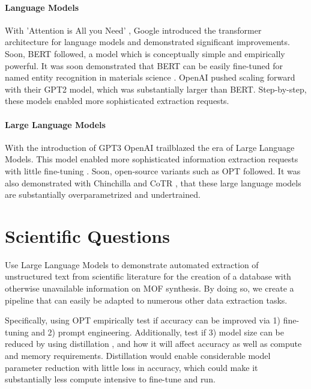 \documentclass[a4paper,12pt]{article}
\newcommand{\margtodo}                                 %
{\marginpar{\textbf{\textcolor{red}{ToDo}}}{}}
\newcommand{\todo}[1]
{{\textbf{\textcolor{red}{[\margtodo{}#1]}}}{}}   %
\begin{document}
\paragraph{Language Models}
With 'Attention is All you Need' \cite{vaswani_attention_2017}, Google
introduced the transformer architecture for language models and demonstrated
significant improvements. Soon, BERT \cite{devlin_bert_2018} followed, a model
which is conceptually simple and empirically powerful. It was soon demonstrated
that BERT can be easily fine-tuned for named entity recognition in materials
science \cite{zhao_finetuning_2021}. OpenAI pushed scaling forward with their
GPT2 \cite{radford_language_2019} model, which was substantially larger than
BERT. Step-by-step, these models enabled more sophisticated extraction requests.

\paragraph{Large Language Models}
With the introduction of GPT3 \cite{brown_language_2020} OpenAI trailblazed the
era of Large Language Models. This model enabled more sophisticated information
extraction requests with little fine-tuning \cite{dunn_structured_2022}. Soon,
open-source variants such as OPT \cite{zhang_opt_2022} followed. It was also
demonstrated with Chinchilla \cite{hoffmann_training_2022} and CoTR
\cite{zhang_multimodal_2023}, that these large language models are
substantially overparametrized and undertrained.


\section{Scientific Questions}
Use Large Language Models to demonstrate automated extraction of unstructured
text from scientific literature for the creation of a database with otherwise
unavailable information on MOF synthesis. By doing so, we create a pipeline
that can easily be adapted to numerous other data extraction tasks.

Specifically, using OPT \cite{zhang_opt_2022} empirically test if accuracy can
be improved via 1) fine-tuning and 2) prompt engineering. Additionally,
test if 3) model size can be reduced by using distillation
\cite{sun_patient_2019}, and how it will affect accuracy as well as compute and
memory requirements. Distillation would enable considerable model parameter
reduction with little loss in accuracy, which could make it substantially
less compute intensive to fine-tune and run.
\end{document}
